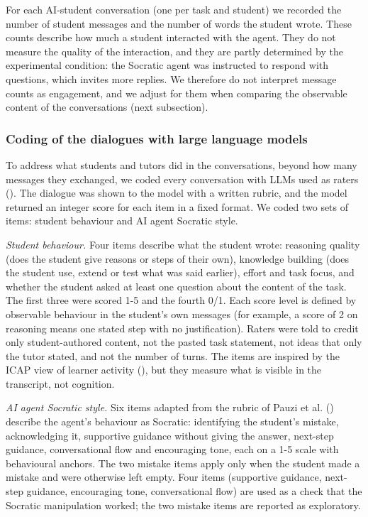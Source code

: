 \documentclass[
  12pt,
]{article}
\begin{document}
For each AI-student conversation (one per task and student) we recorded the number of student messages and the number of words the student wrote. These counts describe how much a student interacted with the agent. They do not measure the quality of the interaction, and they are partly determined by the experimental condition: the Socratic agent was instructed to respond with questions, which invites more replies. We therefore do not interpret message counts as engagement, and we adjust for them when comparing the observable content of the conversations (next subsection).

\subsubsection{Coding of the dialogues with large language models}\label{sec:llm-coding}

To address what students and tutors did in the conversations, beyond how many messages they exchanged, we coded every conversation with LLMs used as raters (). The dialogue was shown to the model with a written rubric, and the model returned an integer score for each item in a fixed format. We coded two sets of items: student behaviour and AI agent Socratic style.

\emph{Student behaviour.} Four items describe what the student wrote: reasoning quality (does the student give reasons or steps of their own), knowledge building (does the student use, extend or test what was said earlier), effort and task focus, and whether the student asked at least one question about the content of the task. The first three were scored 1-5 and the fourth 0/1. Each score level is defined by observable behaviour in the student's own messages (for example, a score of 2 on reasoning means one stated step with no justification). Raters were told to credit only student-authored content, not the pasted task statement, not ideas that only the tutor stated, and not the number of turns. The items are inspired by the ICAP view of learner activity (), but they measure what is visible in the transcript, not cognition.

\emph{AI agent Socratic style.} Six items adapted from the rubric of Pauzi et al. () describe the agent's behaviour as Socratic: identifying the student's mistake, acknowledging it, supportive guidance without giving the answer, next-step guidance, conversational flow and encouraging tone, each on a 1-5 scale with behavioural anchors. The two mistake items apply only when the student made a mistake and were otherwise left empty. Four items (supportive guidance, next-step guidance, encouraging tone, conversational flow) are used as a check that the Socratic manipulation worked; the two mistake items are reported as exploratory.
\end{document}

